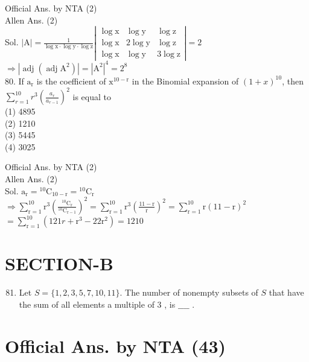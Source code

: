 \documentclass[10pt]{article}
\begin{document}
Official Ans. by NTA (2)\\
Allen Ans. (2)\\
Sol. \(|\mathrm{A}|=\frac{1}{\log \mathrm{x} \cdot \log \mathrm{y} \cdot \log \mathrm{z}}\left|\begin{array}{lll}\log \mathrm{x} & \log \mathrm{y} & \log \mathrm{z} \\ \log \mathrm{x} & 2 \log \mathrm{y} & \log \mathrm{z} \\ \log \mathrm{x} & \log \mathrm{y} & 3 \log \mathrm{z}\end{array}\right|=2\)\\
\(\Rightarrow\left|\operatorname{adj}\left(\operatorname{adj} \mathrm{A}^{2}\right)\right|=\left|\mathrm{A}^{2}\right|^{4}=2^{8}\)\\
80. If \(\mathrm{a}_{\mathrm{r}}\) is the coefficient of \(\mathrm{x}^{10-\mathrm{r}}\) in the Binomial expansion of \((1+x)^{10}\), then \(\sum_{r=1}^{10} r^{3}\left(\frac{a_{r}}{a_{r-1}}\right)^{2}\) is equal to\\
(1) 4895\\
(2) 1210\\
(3) 5445\\
(4) 3025

Official Ans. by NTA (2)\\
Allen Ans. (2)\\
Sol. \(\mathrm{a}_{\mathrm{r}}={ }^{10} \mathrm{C}_{10-\mathrm{r}}={ }^{10} \mathrm{C}_{\mathrm{r}}\)\\
\(\Rightarrow \sum_{\mathrm{r}=1}^{10} \mathrm{r}^{3}\left(\frac{{ }^{10} \mathrm{C}_{\mathrm{r}}}{{ }^{10} \mathrm{C}_{\mathrm{r}-1}}\right)^{2}=\sum_{\mathrm{r}=1}^{10} \mathrm{r}^{3}\left(\frac{11-\mathrm{r}}{\mathrm{r}}\right)^{2}=\sum_{\mathrm{r}=1}^{10} \mathrm{r}(11-\mathrm{r})^{2}\)\\
\(=\sum_{\mathrm{r}=1}^{10}\left(121 r+\mathrm{r}^{3}-22 \mathrm{r}^{2}\right)=1210\)

\section*{SECTION-B}
\begin{enumerate}
  \setcounter{enumi}{80}
  \item Let \(S=\{1,2,3,5,7,10,11\}\). The number of nonempty subsets of \(S\) that have the sum of all elements a multiple of 3 , is \(\_\_\_\_\) .
\end{enumerate}

\section*{Official Ans. by NTA (43)}
\end{document}
